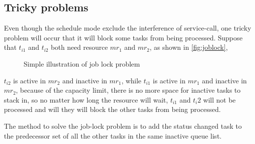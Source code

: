 \subsection{Tricky problems} %
\label{sub:tricky_problems}
Even though the schedule mode exclude the interference of service-call, one tricky problem will occur that it will block some tasks from being processed. Suppose that $t_{i1}$ and $t_{i2}$ both need resource $mr_1$ and $mr_2$, as shown in \autoref{fig:joblock}, 
\begin{figure}[htbp]
	\centering
	\resizebox{.85\textwidth}{!}{}
	\caption{Simple illustration of job lock problem}
	\label{fig:joblock}
\end{figure}
$t_{i2}$ is active in $mr_2$ and inactive in $mr_1$, while $t_{i1}$ is active in $mr_1$ and inactive in $mr_2$, because of the capacity limit, there is no more space for inactive tasks to stack in, so no matter how long the resource will wait, $t_{i1}$ and $t_i2$ will not be processed and will they will block the other tasks from being processed.

The method to solve the job-lock problem is to add the status changed task to the predecessor set of all the other tasks in the same inactive queue list.
